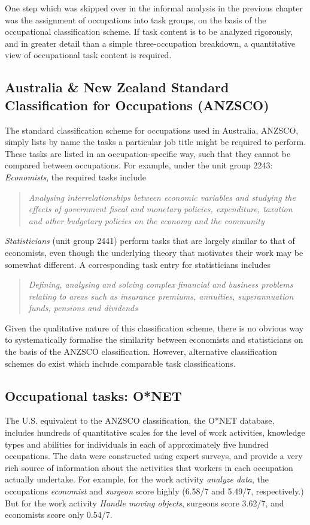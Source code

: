 One step which was skipped over in the informal analysis in the previous chapter was the assignment of occupations into task groups, on the basis of the occupational classification scheme. If task content is to be analyzed rigorously, and in greater detail than a simple three-occupation breakdown, a quantitative view of occupational task content is required. 

\subsection{Australia \& New Zealand Standard Classification for Occupations (ANZSCO)}

The standard classification scheme for occupations used in Australia, ANZSCO, simply lists by name the tasks a particular job title might be required to perform. These tasks are listed in an occupation-specific way, such that they cannot be compared between occupations. For example, under the unit group 2243: {\em Economists}, the required tasks include
\begin{quote}
{\em Analysing interrelationships between economic variables and studying the effects of government fiscal and monetary policies, expenditure, taxation and other budgetary policies on the economy and the community \citep[p.185]{Trewin2006}}
\end{quote}

{\em Statisticians} (unit group 2441) perform tasks that are largely similar to that of economists, even though the underlying theory that motivates their work may be somewhat different. A corresponding task entry for statisticians includes
\begin{quote}
{\em Defining, analysing and solving complex financial and business problems relating to areas such as insurance premiums, annuities, superannuation funds, pensions and dividends \citep[p.181]{Trewin2006}}
\end{quote}
Given the qualitative nature of this classification scheme, there is no obvious way to systematically formalise the similarity between economists and statisticians on the basis of the ANZSCO classification. However, alternative classification schemes do exist which include comparable task classifications.

\subsection{Occupational tasks: O*NET}\label{sec:onet}

The U.S. equivalent to the ANZSCO classification, the O*NET database, includes hundreds of quantitative scales for the level of work activities, knowledge types and abilities for individuals in each of approximately five hundred occupations. The data were constructed using expert surveys, and provide a very rich source of information about the activities that workers in each occupation actually undertake. For example, for the work activity {\em analyze data}, the occupations {\em economist} and {\em surgeon} score highly (6.58/7 and 5.49/7, respectively.) But for the work activity {\em Handle moving objects}, surgeons score 3.62/7, and economists score only 0.54/7.

